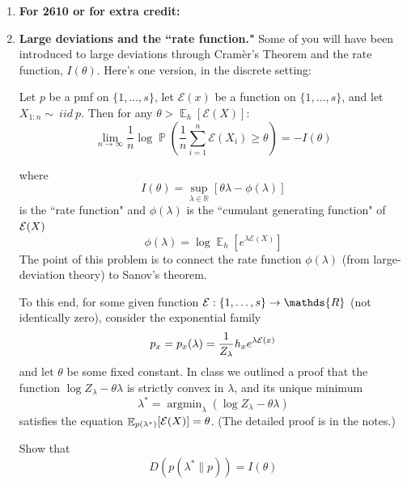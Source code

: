 \documentclass[11pt]{report}
\DeclareMathOperator{\Prob}{\mathbb{P}}
\DeclareMathOperator{\Exp}{\mathbb{E}}
\DeclareMathOperator*{\argmin}{\arg\min}
\begin{document}
\begin{enumerate}[1.]
          \medskip

          \hrule

          \medskip

          \pagebreak
    \item[] \hspace{-3ex} {\bf For 2610 or for extra credit:}



    \item {\bf Large deviations and the ``rate function."}
          Some of you will have been introduced to large deviations through Cram\`er's Theorem and the rate function, $I(\theta)$. Here's one version, in the discrete setting:

          Let $p$ be a pmf on $\{1,\ldots,s\}$, let $\mathcal{E}(x)$ be a function on $\{1,\ldots,s\}$, and let $X_{1:n} \sim\ iid\ p$. Then for any $\theta>\Exp_h[\mathcal{E}(X)]$:
          \begin{equation}
              \label{eqn:LDT}
              \lim_{n\to\infty} \frac{1}{n} \log \Prob \left( \frac{1}{n}\sum_{i=1}^n \mathcal{E}(X_i) \geq \theta \right) = -I(\theta)
          \end{equation}

          where
          \[
              I(\theta) =
              \sup_{\lambda\in\mathds{R}} \left[ \theta\lambda - \phi(\lambda) \right]
          \]
          is the ``rate function" and $\phi(\lambda)$ is the ``cumulant generating function" of ${\cal E}(X)$
          \[
              \phi(\lambda) = \log \Exp_h\left[ e^{\lambda \mathcal{E}(X)}\right]
          \]
          The point of this problem is to connect the rate function $\phi(\lambda)$ (from large-deviation theory) to Sanov's theorem.

          To this end, for some given function ${\cal E}:\{1,\ldots,s\}\to\mathds{R}$ (not identically zero), consider the exponential family
          \[
              p_x = p_x(\lambda) = \frac{1}{Z_\lambda}h_x e^{\lambda {\cal E}(x)}
          \]
          and let $\theta$ be some fixed constant. In class we outlined a proof that the function
          $\log Z_{\lambda} - \theta\lambda$
          is strictly convex in $\lambda$, and its unique minimum
          \[
              \lambda^* = \argmin_{\lambda} \left(\log Z_{\lambda} - \theta\lambda\right)
          \]
          satisfies the equation $\Exp_{p(\lambda^*)}[{\cal E}(X)] = \theta$. (The detailed proof is in the notes.)

          Show that
          \[
              D(p(\lambda^*\|p)) = I(\theta)
          \]




\end{enumerate}
\end{document}
